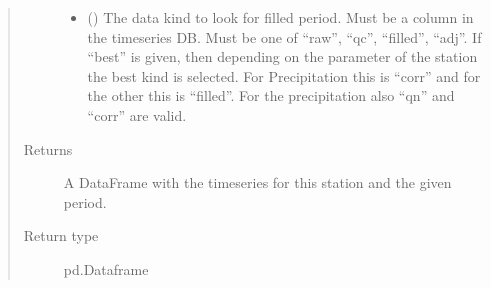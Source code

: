 \documentclass[letterpaper,10pt,english]{sphinxmanual}
\begin{document}
\begin{fulllineitems}
\begin{fulllineitems}
\begin{quote}
\begin{description}
\begin{itemize}
\item {} 
\sphinxAtStartPar
{} () \textendash{} The data kind to look for filled period.
Must be a column in the timeseries DB.
Must be one of “raw”, “qc”, “filled”, “adj”.
If “best” is given, then depending on the parameter of the station the best kind is selected.
For Precipitation this is “corr” and for the other this is “filled”.
For the precipitation also “qn” and “corr” are valid.

\end{itemize}

\item[{Returns}] \leavevmode
\sphinxAtStartPar
A DataFrame with the timeseries for this station and the given period.

\item[{Return type}] \leavevmode
\sphinxAtStartPar
pd.Dataframe

\end{description}\end{quote}

\end{fulllineitems}


\begin{fulllineitems}
\label{\detokenize{weatherDB:weatherDB.station.GroupStation.get_filled_period}}
\end{fulllineitems}


\begin{fulllineitems}
\label{\detokenize{weatherDB:weatherDB.station.GroupStation.get_geom}}
\end{fulllineitems}


\begin{fulllineitems}
\label{\detokenize{weatherDB:weatherDB.station.GroupStation.get_name}}
\end{fulllineitems}


\end{fulllineitems}
\end{document}
